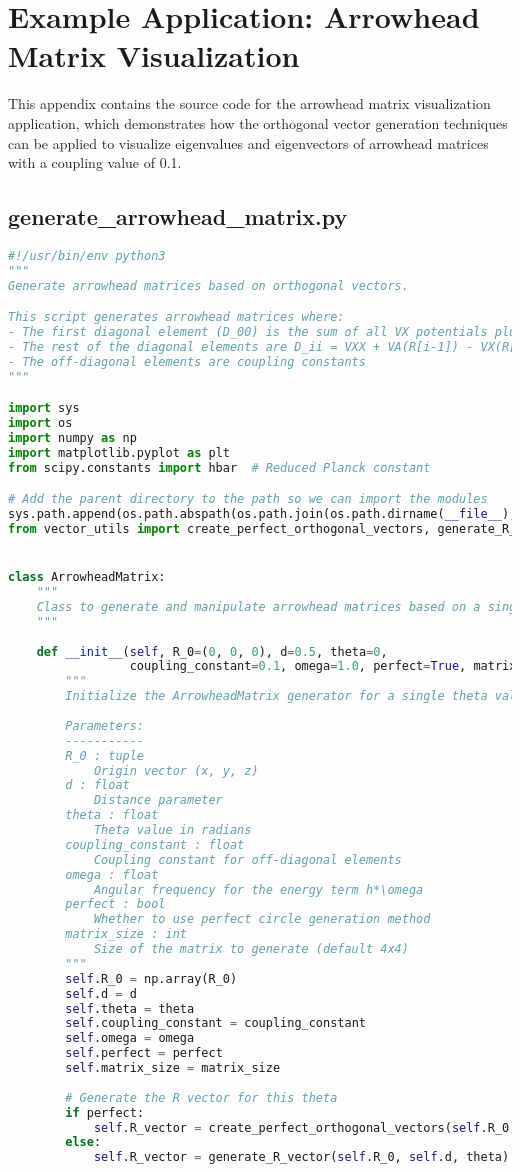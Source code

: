 \newpage
\section{Example Application: Arrowhead Matrix Visualization}

This appendix contains the source code for the arrowhead matrix visualization application, which demonstrates how the orthogonal vector generation techniques can be applied to visualize eigenvalues and eigenvectors of arrowhead matrices with a coupling value of 0.1.

\subsection{generate\_arrowhead\_matrix.py}

\begin{lstlisting}[language=Python]
#!/usr/bin/env python3
"""
Generate arrowhead matrices based on orthogonal vectors.

This script generates arrowhead matrices where:
- The first diagonal element (D_00) is the sum of all VX potentials plus h*\omega
- The rest of the diagonal elements are D_ii = VXX + VA(R[i-1]) - VX(R[i-1])
- The off-diagonal elements are coupling constants
"""

import sys
import os
import numpy as np
import matplotlib.pyplot as plt
from scipy.constants import hbar  # Reduced Planck constant

# Add the parent directory to the path so we can import the modules
sys.path.append(os.path.abspath(os.path.join(os.path.dirname(__file__), '../..')))
from vector_utils import create_perfect_orthogonal_vectors, generate_R_vector


class ArrowheadMatrix:
    """
    Class to generate and manipulate arrowhead matrices based on a single orthogonal vector.
    """
    
    def __init__(self, R_0=(0, 0, 0), d=0.5, theta=0, 
                 coupling_constant=0.1, omega=1.0, perfect=True, matrix_size=4):
        """
        Initialize the ArrowheadMatrix generator for a single theta value.
        
        Parameters:
        -----------
        R_0 : tuple
            Origin vector (x, y, z)
        d : float
            Distance parameter
        theta : float
            Theta value in radians
        coupling_constant : float
            Coupling constant for off-diagonal elements
        omega : float
            Angular frequency for the energy term h*\omega
        perfect : bool
            Whether to use perfect circle generation method
        matrix_size : int
            Size of the matrix to generate (default 4x4)
        """
        self.R_0 = np.array(R_0)
        self.d = d
        self.theta = theta
        self.coupling_constant = coupling_constant
        self.omega = omega
        self.perfect = perfect
        self.matrix_size = matrix_size
        
        # Generate the R vector for this theta
        if perfect:
            self.R_vector = create_perfect_orthogonal_vectors(self.R_0, self.d, theta)
        else:
            self.R_vector = generate_R_vector(self.R_0, self.d, theta)
\end{lstlisting}

